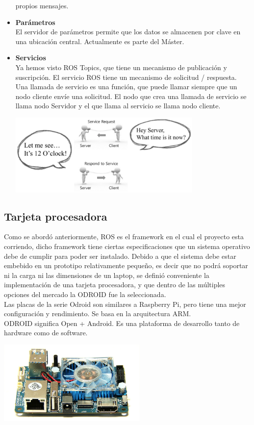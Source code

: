 \begin{itemize}
    propios mensajes.
    \item \textbf{Parámetros}\\
    El servidor de parámetros permite que los datos se almacenen por clave en una 
    ubicación central. Actualmente es parte del Máster.
    \item \textbf{Servicios}\\
    Ya hemos visto ROS Topics, que tiene un mecanismo de publicación y suscripción. 
    El servicio ROS tiene un mecanismo de solicitud / respuesta. Una llamada de 
    servicio es una función, que puede llamar siempre que un nodo cliente envíe una 
    solicitud. El nodo que crea una llamada de servicio se llama nodo Servidor y el 
    que llama al servicio se llama nodo cliente.~\cite{ROSLENTIN}
    \begin{center}
        \includegraphics[width=0.75\textwidth]{Capitulo2/Fig4.eps}       
        \label{Fig4}
    \end{center}
 
\end{itemize}
\subsection{Tarjeta procesadora}
Como se abordó anteriormente, ROS es el framework en el cual el proyecto esta corriendo,
dicho framework tiene ciertas especificaciones que un sistema operativo debe de cumplir
para poder ser instalado. Debido a que el sistema debe estar embebido en un prototipo
relativamente pequeño, es decir que no podrá soportar ni la carga ni las dimensiones
de un laptop, se definió conveniente la implementación de una tarjeta procesadora, y que
dentro de las múltiples opciones del mercado la ODROID fue la seleccionada.\\
Las placas de la serie Odroid son similares a Raspberry Pi, pero tiene una mejor 
configuración y rendimiento. Se basa en la arquitectura ARM.~\cite{ROSLENTIN}\\
ODROID significa Open + Android. Es una plataforma de desarrollo tanto de 
hardware como de software. 
\begin{center}
    \includegraphics[width=0.55\textwidth]{Capitulo2/Fig5.eps}       
    \label{Fig5}
\end{center}

